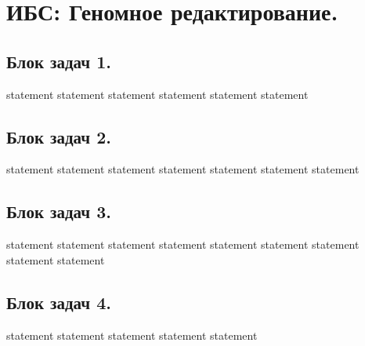 \chapter{ИБС: Геномное редактирование.}

\section{Блок задач 1.}

{statement}
{statement}
{statement}
{statement}
{statement}
{statement}

\section{Блок задач 2.}

{statement}
{statement}
{statement}
{statement}
{statement}
{statement}
{statement}

\section{Блок задач 3.}

{statement}
{statement}
{statement}
{statement}
{statement}
{statement}
{statement}
{statement}
{statement}

\section{Блок задач 4.}

{statement}
{statement}
{statement}
{statement}
{statement}